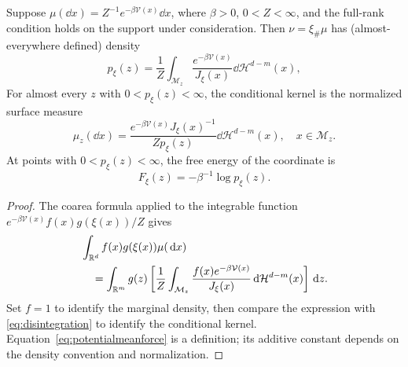 \documentclass[12pt,a4paper,oneside]{book}
\begin{document}
\begin{theorem}
\label{thm:coarea}
\label{src:p12q3}
Suppose $\mu(\dd x)=Z^{-1}e^{-\beta \mathcal V(x)}\dd x$, where $\beta>0$,
$0<Z<\infty$, and the full-rank condition holds on the support
under consideration. Then $\nu=\xi_\#\mu$
has (almost-everywhere defined) density
\begin{equation*}
p_\xi(z)=\frac1Z\int_{\mathcal M_z}
 \frac{e^{-\beta \mathcal V(x)}}{J_\xi(x)}\dd\mathcal H^{d-m}(x),
\end{equation*}
For almost every $z$ with $0<p_\xi(z)<\infty$, the conditional
kernel is the normalized surface measure
\begin{equation}
 \mu_z(\dd x)=\frac{e^{-\beta \mathcal V(x)}J_\xi(x)^{-1}}{Zp_\xi(z)}
 \dd\mathcal H^{d-m}(x),\quad x\in\mathcal M_z.
\label{eq:conditionalsurface}
\end{equation}
At points with $0<p_\xi(z)<\infty$, the free energy of the coordinate is
\begin{equation}
 F_\xi(z)=-\beta^{-1}\log p_\xi(z).
\label{eq:potentialmeanforce}
\end{equation}
\end{theorem}
\begin{proof}
The coarea formula applied to the integrable function
$e^{-\beta \mathcal V(x)}f(x)g(\xi(x))/Z$ gives
\begin{equation*}
\begin{aligned}
 &\int_{\mathbb{R}^d}f(x)g(\xi(x))\mu(\,\mathrm{d} x)\\
 &\quad=\int_{\mathbb{R}^m}g(z)\left[\frac1Z\int_{\mathcal M_z}
 \frac{f(x)e^{-\beta \mathcal V(x)}}{J_\xi(x)}\,\mathrm{d}\mathcal H^{d-m}(x)\right]\,\mathrm{d} z.
\end{aligned}
\end{equation*}
Set $f=1$ to identify the marginal density, then compare the expression
with \eqref{eq:disintegration} to identify the conditional kernel.
Equation~\eqref{eq:potentialmeanforce} is a definition; its additive
constant depends on the density convention and normalization.
\end{proof}
\end{document}
